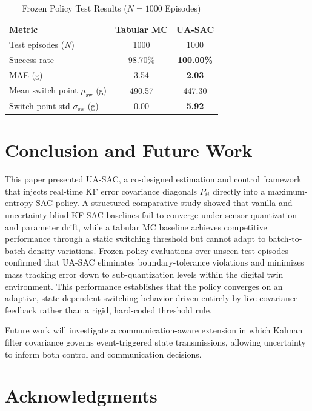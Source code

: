 \documentclass[conference]{IEEEtran}
\begin{document}
\begin{table}[!t]
\renewcommand{\arraystretch}{1.3}
\caption{Frozen Policy Test Results ($N=1000$ Episodes)}
\label{tab:test}
\centering
\begin{tabular}{lcc}
\hline\hline
\bfseries Metric & \bfseries Tabular MC &
\bfseries UA-SAC \\
\hline
Test episodes ($N$) & 1000 & 1000 \\
Success rate & 98.70\% & \textbf{100.00\%} \\
MAE (g) & 3.54 & \textbf{2.03} \\
Mean switch point $\mu_\text{sw}$ (g) & 490.57 & 447.30 \\
Switch point std $\sigma_\text{sw}$ (g) & 0.00 & \textbf{5.92} \\
\hline\hline
\end{tabular}
\end{table}

\section{Conclusion and Future Work}
\label{sec:conclusion}

This paper presented UA-SAC, a co-designed estimation 
and control framework that injects real-time KF error 
covariance diagonals $P_{ii}$ directly into a 
maximum-entropy SAC policy. A structured comparative 
study showed that vanilla and uncertainty-blind KF-SAC 
baselines fail to converge under sensor quantization 
and parameter drift, while a tabular MC baseline 
achieves competitive performance through a static 
switching threshold but cannot adapt to batch-to-batch 
density variations. Frozen-policy evaluations over unseen test episodes confirmed that 
UA-SAC eliminates boundary-tolerance violations and minimizes mass tracking 
error down to sub-quantization levels within the digital twin environment. 
This performance establishes that the policy converges on an adaptive, 
state-dependent switching behavior driven entirely by live covariance 
feedback rather than a rigid, hard-coded threshold rule.

Future work will investigate a communication-aware extension in which Kalman filter covariance governs event-triggered state transmissions, allowing uncertainty to inform both control and communication decisions.
\section*{Acknowledgments}
\end{document}
